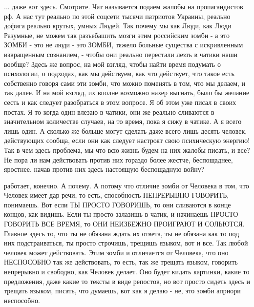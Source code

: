 ... даже вот здесь. Смотрите. Чат называется подаем жалобы на пропагандистов
рф. А нас тут реально по этой соцсети тысячи патриотов Украины, реально дофига
реально крутых, умных Людей. Так почему мы как Люди, как Люди Разумные, не
можем так разъебашить мозги этим российским зомби - а это ЗОМБИ - это не люди -
это ЗОМБИ, тяжело больные существа с искривленным извращенным сознанием, -
чтобы они реально перестали лезть в чатики наши вообще? Здесь же вопрос, на мой
взгляд, чтобы найти время подумать о психологии, о подходах, как мы действуем,
как что действует, что такое есть собственно говоря сами эти зомби, что можно
поменять в том, что мы делаем, и так далее. И на мой взгляд, их вполне возможно
нахер выгнать, было бы желание сесть и как следует разобраться в этом вопросе.
Я об этом уже писал в своих постах. Я то когда один влезаю в чатики, они же
реально сливаются в значительном количестве случаев, на то время, пока я сижу в
чатике. А я всего лишь один. А сколько же больше могут сделать даже всего лишь
десять человек, действующих сообща, если они как следует настроят свою
психическую энергию! Так в чем здесь проблема, мы что всю жизнь будем на них
жалобы писать, и все? Не пора ли нам действовать против них гораздо более
жестче, беспощаднее, яростнее, начав против них здесь настоящую беспощадную
войну?









работает, конечно. А почему. А потому что отличие зомби от Человека в том, что
Человек имеет дар речи, то есть, способность НЕПРЕРЫВНО ГОВОРИТЬ, понимаешь.
Вот если ТЫ ПРОСТО ГОВОРИШЬ, то они сливаются в конце концов, как видишь. Если
ты просто залазишь в чатик, и начинаешь ПРОСТО ГОВОРИТЬ ВСЕ ВРЕМЯ, то ОНИ
НЕИЗБЕЖНО ПРОИГРАЮТ И СОЛЬЮТСЯ. Главное здесь то, что ты не обязана ждать их
ответа, ты не обязана как то под них подстраиваться, ты просто строчишь,
трещишь языком, вот и все. Так любой человек может действовать. Этим зомби и
отличается от Человека, что оно НЕСПОСОБНО так же действовать, то есть, так же
трещать языком, говорить непрерывно и свободно, как Человек делает. Оно будет
кидать картинки, какие то предложения, даже какие то тексты в виде репостов, но
вот просто сидеть здесь и трещать языком, писать, что думаешь, вот как я делаю
- не, это зомби априори неспособно.

